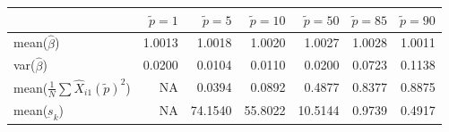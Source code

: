 
\begin{tabular}{lrrrrrr}
\toprule
  & $\tilde{p}=1$ & $\tilde{p}=5$ & $\tilde{p}=10$ & $\tilde{p}=50$ & $\tilde{p}=85$ & $\tilde{p}=90$\\
\midrule
mean($\hat{\beta}$) & 1.0013 & 1.0018 & 1.0020 & 1.0027 & 1.0028 & 1.0011\\
var($\hat{\beta}$) & 0.0200 & 0.0104 & 0.0110 & 0.0200 & 0.0723 & 0.1138\\
mean($\frac{1}{N}\sum \hat{X}_{i1}(\tilde{p})^2$) & NA & 0.0394 & 0.0892 & 0.4877 & 0.8377 & 0.8875\\
mean($\underbar{s}_k$) & NA & 74.1540 & 55.8022 & 10.5144 & 0.9739 & 0.4917\\
\bottomrule
\end{tabular}
